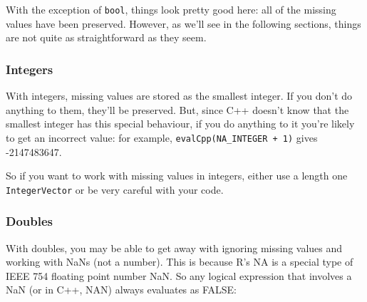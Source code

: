 \begin{Shaded}
\begin{Highlighting}[]
  

   
   
   

   
\NormalTok{\}}
\end{Highlighting}
\end{Shaded}

\begin{Shaded}
\begin{Highlighting}[]
\NormalTok{(}\NormalTok{())}
\end{Highlighting}
\end{Shaded}

With the exception of \texttt{bool}, things look pretty good here: all
of the missing values have been preserved. However, as we'll see in the
following sections, things are not quite as straightforward as they
seem.

\subsubsection{Integers}

With integers, missing values are stored as the smallest integer. If you
don't do anything to them, they'll be preserved. But, since C++ doesn't
know that the smallest integer has this special behaviour, if you do
anything to it you're likely to get an incorrect value: for example,
\texttt{evalCpp(\textquotesingle{}NA\_INTEGER + 1\textquotesingle{})}
gives -2147483647.

So if you want to work with missing values in integers, either use a
length one \texttt{IntegerVector} or be very careful with your code.

\subsubsection{Doubles}

With doubles, you may be able to get away with ignoring missing values
and working with NaNs (not a number). This is because R's NA is a
special type of IEEE 754 floating point number NaN. So any logical
expression that involves a NaN (or in C++, NAN) always evaluates as
FALSE:

